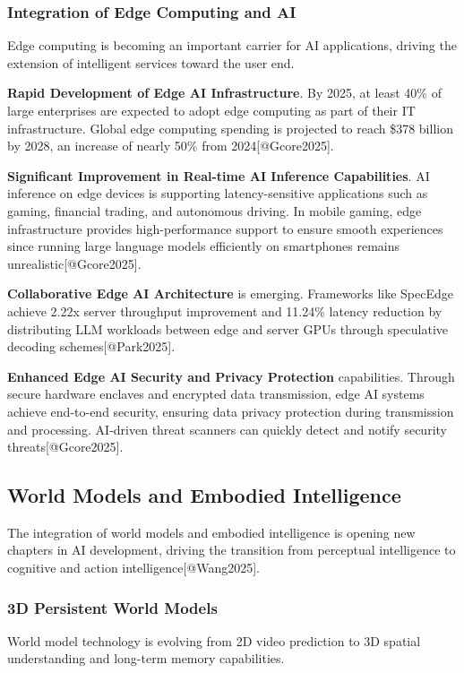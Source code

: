 \documentclass{article}
\begin{document}
\subsubsection{Integration of Edge Computing and AI}
Edge computing is becoming an important carrier for AI applications, driving the extension of intelligent services toward the user end.

\textbf{Rapid Development of Edge AI Infrastructure}. By 2025, at least 40\% of large enterprises are expected to adopt edge computing as part of their IT infrastructure. Global edge computing spending is projected to reach \$378 billion by 2028, an increase of nearly 50\% from 2024[@Gcore2025].

\textbf{Significant Improvement in Real-time AI Inference Capabilities}. AI inference on edge devices is supporting latency-sensitive applications such as gaming, financial trading, and autonomous driving. In mobile gaming, edge infrastructure provides high-performance support to ensure smooth experiences since running large language models efficiently on smartphones remains unrealistic[@Gcore2025].

\textbf{Collaborative Edge AI Architecture} is emerging. Frameworks like SpecEdge achieve 2.22x server throughput improvement and 11.24\% latency reduction by distributing LLM workloads between edge and server GPUs through speculative decoding schemes[@Park2025].

\textbf{Enhanced Edge AI Security and Privacy Protection} capabilities. Through secure hardware enclaves and encrypted data transmission, edge AI systems achieve end-to-end security, ensuring data privacy protection during transmission and processing. AI-driven threat scanners can quickly detect and notify security threats[@Gcore2025].

\subsection{World Models and Embodied Intelligence}
The integration of world models and embodied intelligence is opening new chapters in AI development, driving the transition from perceptual intelligence to cognitive and action intelligence[@Wang2025].

\subsubsection{3D Persistent World Models}
World model technology is evolving from 2D video prediction to 3D spatial understanding and long-term memory capabilities.
\end{document}
